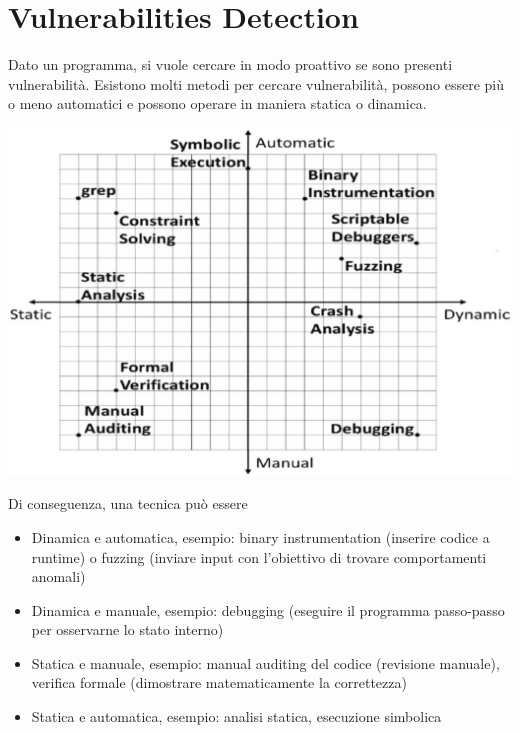 
\section{Vulnerabilities Detection}

Dato un programma, si vuole cercare in modo proattivo se sono presenti vulnerabilità. Esistono molti metodi per cercare vulnerabilità, possono essere più o meno automatici e possono operare in maniera statica o dinamica.
\begin{center}
	\includegraphics[width=0.7\linewidth]{img/vulnerabilities/manaut}
\end{center}

Di conseguenza, una tecnica può essere
\begin{itemize}
	\item Dinamica e automatica, esempio: binary instrumentation (inserire codice a runtime) o fuzzing (inviare input con l'obiettivo di trovare comportamenti anomali)
    
	\item Dinamica e manuale, esempio: debugging (eseguire il programma passo-passo per osservarne lo stato interno)
    
	\item Statica e manuale, esempio: manual auditing del codice (revisione manuale), verifica formale (dimostrare matematicamente la correttezza)
    
	\item Statica e automatica, esempio: analisi statica, esecuzione simbolica
\end{itemize}

